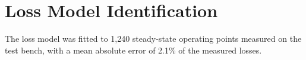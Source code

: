 \chapter{Loss Model Identification}
\label{app:a}

The loss model was fitted to 1,240 steady-state operating points measured on the test bench,
with a mean absolute error of 2.1\% of the measured losses.
